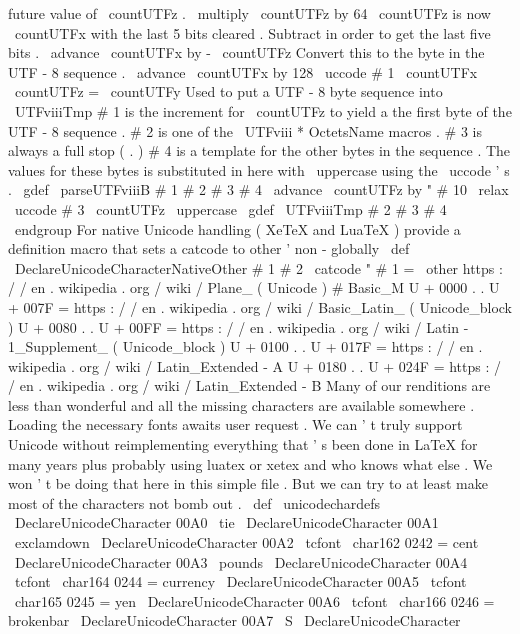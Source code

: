 {{{{{future
value
of
\
countUTFz
.
\
multiply
\
countUTFz
by
64
%
\
countUTFz
is
now
\
countUTFx
with
the
last
5
bits
cleared
.
Subtract
%
in
order
to
get
the
last
five
bits
.
\
advance
\
countUTFx
by
-
\
countUTFz
%
Convert
this
to
the
byte
in
the
UTF
-
8
sequence
.
\
advance
\
countUTFx
by
128
\
uccode
#
1
\
countUTFx
\
countUTFz
=
\
countUTFy
}
%
Used
to
put
a
UTF
-
8
byte
sequence
into
\
UTFviiiTmp
%
#
1
is
the
increment
for
\
countUTFz
to
yield
a
the
first
byte
of
the
UTF
-
8
%
sequence
.
%
#
2
is
one
of
the
\
UTFviii
*
OctetsName
macros
.
%
#
3
is
always
a
full
stop
(
.
)
%
#
4
is
a
template
for
the
other
bytes
in
the
sequence
.
The
values
for
these
%
bytes
is
substituted
in
here
with
\
uppercase
using
the
\
uccode
'
s
.
\
gdef
\
parseUTFviiiB
#
1
#
2
#
3
#
4
{
%
\
advance
\
countUTFz
by
"
#
10
\
relax
\
uccode
#
3
\
countUTFz
\
uppercase
{
\
gdef
\
UTFviiiTmp
{
#
2
#
3
#
4
}
}
}
\
endgroup
%
For
native
Unicode
handling
(
XeTeX
and
LuaTeX
)
%
provide
a
definition
macro
that
sets
a
catcode
to
other
'
non
-
globally
%
\
def
\
DeclareUnicodeCharacterNativeOther
#
1
#
2
{
%
\
catcode
"
#
1
=
\
other
}
%
https
:
/
/
en
.
wikipedia
.
org
/
wiki
/
Plane_
(
Unicode
)
#
Basic_M
%
U
+
0000
.
.
U
+
007F
=
https
:
/
/
en
.
wikipedia
.
org
/
wiki
/
Basic_Latin_
(
Unicode_block
)
%
U
+
0080
.
.
U
+
00FF
=
https
:
/
/
en
.
wikipedia
.
org
/
wiki
/
Latin
-
1_Supplement_
(
Unicode_block
)
%
U
+
0100
.
.
U
+
017F
=
https
:
/
/
en
.
wikipedia
.
org
/
wiki
/
Latin_Extended
-
A
%
U
+
0180
.
.
U
+
024F
=
https
:
/
/
en
.
wikipedia
.
org
/
wiki
/
Latin_Extended
-
B
%
%
Many
of
our
renditions
are
less
than
wonderful
and
all
the
missing
%
characters
are
available
somewhere
.
Loading
the
necessary
fonts
%
awaits
user
request
.
We
can
'
t
truly
support
Unicode
without
%
reimplementing
everything
that
'
s
been
done
in
LaTeX
for
many
years
%
plus
probably
using
luatex
or
xetex
and
who
knows
what
else
.
%
We
won
'
t
be
doing
that
here
in
this
simple
file
.
But
we
can
try
to
at
%
least
make
most
of
the
characters
not
bomb
out
.
%
\
def
\
unicodechardefs
{
%
\
DeclareUnicodeCharacter
{
00A0
}
{
\
tie
}
%
\
DeclareUnicodeCharacter
{
00A1
}
{
\
exclamdown
}
%
\
DeclareUnicodeCharacter
{
00A2
}
{
{
\
tcfont
\
char162
}
}
%
0242
=
cent
\
DeclareUnicodeCharacter
{
00A3
}
{
\
pounds
{
}
}
%
\
DeclareUnicodeCharacter
{
00A4
}
{
{
\
tcfont
\
char164
}
}
%
0244
=
currency
\
DeclareUnicodeCharacter
{
00A5
}
{
{
\
tcfont
\
char165
}
}
%
0245
=
yen
\
DeclareUnicodeCharacter
{
00A6
}
{
{
\
tcfont
\
char166
}
}
%
0246
=
brokenbar
\
DeclareUnicodeCharacter
{
00A7
}
{
\
S
}
%
\
DeclareUnicodeCharacter
}}}}}
